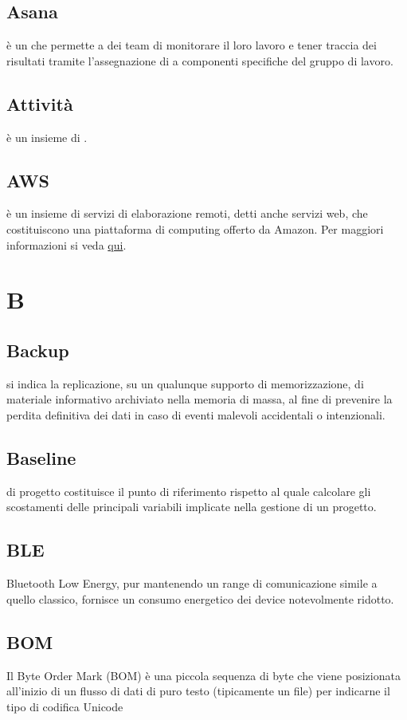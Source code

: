 \documentclass[12pt,a4paper]{article}
\begin{document}
\subsection{Asana}
è un  che permette a dei team di monitorare il loro lavoro e tener traccia dei risultati tramite l'assegnazione di  a componenti specifiche del gruppo di lavoro.

\subsection{Attività}
è un insieme di .

\subsection{AWS}
è un insieme di servizi di elaborazione remoti, detti anche servizi web, che costituiscono una piattaforma di computing offerto da Amazon. Per maggiori informazioni si veda \href{https://aws.amazon.com/it/}{qui}.


\newpage

\section{B}


\subsection{Backup}
si indica la replicazione, su un qualunque supporto di memorizzazione, di materiale informativo archiviato nella memoria di massa, al fine di prevenire la perdita definitiva dei dati in caso di eventi malevoli accidentali o intenzionali.

\subsection{Baseline}
 di progetto costituisce il punto di riferimento rispetto al quale calcolare gli scostamenti delle principali variabili implicate nella gestione di un progetto.

\subsection{BLE}
 Bluetooth Low Energy,  pur mantenendo un range di comunicazione simile a quello classico, fornisce un  consumo energetico dei device notevolmente ridotto.
 
 \subsection{BOM}
 Il Byte Order Mark (BOM) è una piccola sequenza di byte che viene posizionata all'inizio di un flusso di dati di puro testo (tipicamente un file) per indicarne il tipo di codifica Unicode
\end{document}
